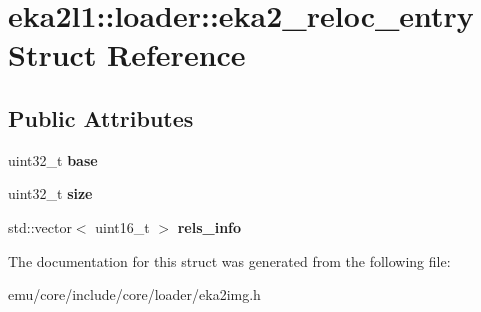 \hypertarget{structeka2l1_1_1loader_1_1eka2__reloc__entry}{}\section{eka2l1\+:\+:loader\+:\+:eka2\+\_\+reloc\+\_\+entry Struct Reference}
\label{structeka2l1_1_1loader_1_1eka2__reloc__entry}
\subsection*{Public Attributes}
\begin{DoxyCompactItemize}
\item 
\mbox{\label{structeka2l1_1_1loader_1_1eka2__reloc__entry_a1729b0cce52ecc79e0d468acaaba4202}} 
uint32\+\_\+t {\bfseries base}
\item 
\mbox{\label{structeka2l1_1_1loader_1_1eka2__reloc__entry_a793410f71d4e3dc2ce4936c8034fcf4c}} 
uint32\+\_\+t {\bfseries size}
\item 
\mbox{\label{structeka2l1_1_1loader_1_1eka2__reloc__entry_a6a55464a402adefdcc6ce3d128fe00e0}} 
std\+::vector$<$ uint16\+\_\+t $>$ {\bfseries rels\+\_\+info}
\end{DoxyCompactItemize}


The documentation for this struct was generated from the following file\+:\begin{DoxyCompactItemize}
\item 
emu/core/include/core/loader/eka2img.\+h\end{DoxyCompactItemize}
